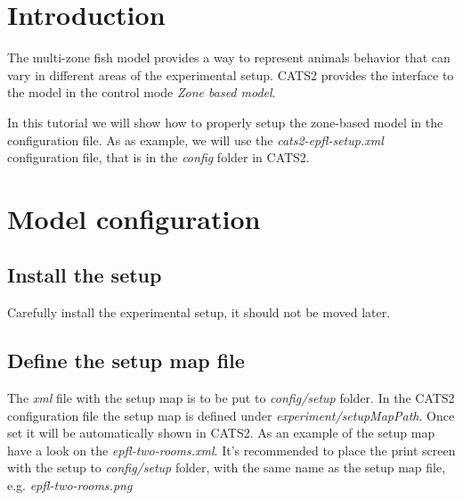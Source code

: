\documentclass{styles/assisi}
\begin{document}

\lstset{
    language=xml,
    tabsize=3,
    xleftmargin=20pt,
    framexleftmargin=15pt,
    numbers=left,
    numberstyle=\tiny,
    numbersep=5pt,
    breaklines=true,
    showstringspaces=false,
    basicstyle=\footnotesize}

\chapter{Introduction}\label{chap:intro}
The multi-zone fish model provides a way to represent animals behavior that 
can vary in different areas of the experimental setup. CATS2 provides the interface to the model in the control mode {\it Zone based model}.

In this tutorial we will show how to properly setup the zone-based model in the configuration file. As as example, we will use the {\it cats2-epfl-setup.xml} configuration file, that is in the {\it config} folder in CATS2.

\chapter{Model configuration}\label{chap:intro}
\section{Install the setup}
Carefully install the experimental setup, it should not be moved later. 

\section{Define the setup map file}
The {\it xml} file with the setup map is to be put to {\it config/setup} folder. In the CATS2 configuration file the setup map is defined under {\it experiment/setupMapPath}. Once set it will be automatically shown in CATS2. As an example of the setup map have a look on the {\it epfl-two-rooms.xml}. It's recommended to place the print screen with the setup to  {\it config/setup} folder, with the same name as the setup map file, e.g. {\it epfl-two-rooms.png}
\end{document}
